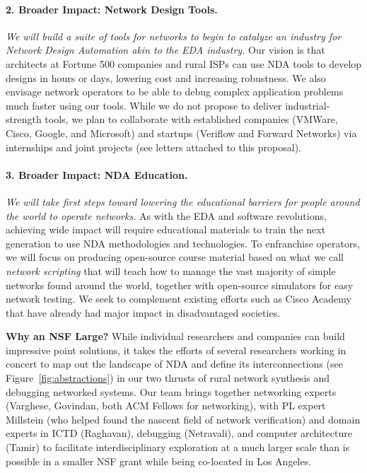 \paragraph*{2. Broader Impact: Network Design Tools.}{\em We will build a suite of tools for networks to begin to catalyze an industry for Network Design Automation akin to the EDA industry.}
%
 Our vision is that architects at Fortune 500 companies and rural ISPs  can use NDA tools to develop designs in hours or days, lowering cost and increasing robustness. We also envisage network operators to be able to debug complex application problems much faster using our tools.  While we do not propose to deliver industrial-strength tools, we plan to collaborate with established companies (VMWare, Cisco, Google, and Microsoft) and startups (Veriflow and Forward Networks) via internships and joint projects (see letters  attached to this proposal).

\paragraph*{3. Broader Impact: NDA Education.} {\em We will take first steps toward lowering the educational barriers for people around the world to operate networks.}
%
As with the EDA and software revolutions, achieving wide impact will require educational materials to train the next generation to use NDA methodologies and technologies. To enfranchise operators, we will focus on producing open-source course material based on what we call {\em network scripting} that will teach how to manage the vast majority of simple networks found around the world, together with open-source simulators for easy network testing. We seek to complement existing efforts such as Cisco Academy~\cite{ciscoacademy} that have already had major impact in disadvantaged societies.

{\bf Why an NSF Large?}  While individual researchers and companies can build impressive point solutions, it takes the efforts of several researchers working in concert to map out the landscape of NDA and define its interconnections (see Figure~\ref{fig:abstractions}) in our two thrusts of rural network synthesis and
debugging networked systems.  Our team brings together networking experts (Varghese, Govindan, both ACM Fellows for networking), with PL expert Millstein (who helped found the nascent field of network verification) and domain experts in ICTD (Raghavan), debugging (Netravali), and computer architecture (Tamir) to facilitate interdisciplinary exploration at a much larger scale than is possible in a smaller NSF grant while being co-located in Los Angeles.

